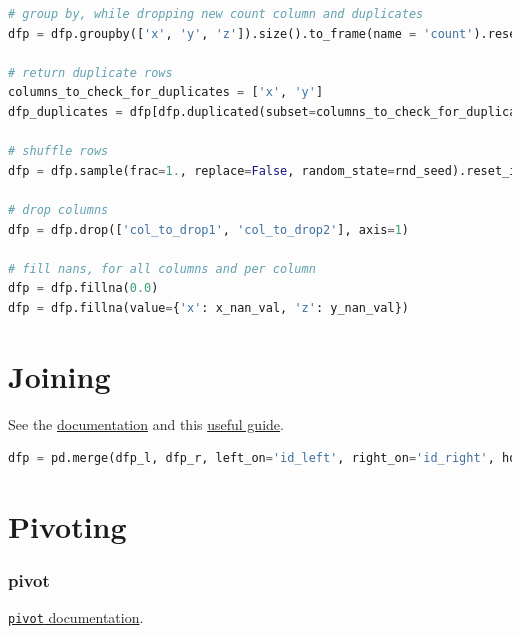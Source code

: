 \begin{lstlisting}[language=Python]
# group by, while dropping new count column and duplicates
dfp = dfp.groupby(['x', 'y', 'z']).size().to_frame(name = 'count').reset_index().drop(['count'], axis=1).drop_duplicates()

# return duplicate rows
columns_to_check_for_duplicates = ['x', 'y']
dfp_duplicates = dfp[dfp.duplicated(subset=columns_to_check_for_duplicates, keep=False)]

# shuffle rows
dfp = dfp.sample(frac=1., replace=False, random_state=rnd_seed).reset_index(drop=True)

# drop columns
dfp = dfp.drop(['col_to_drop1', 'col_to_drop2'], axis=1)

# fill nans, for all columns and per column
dfp = dfp.fillna(0.0)
dfp = dfp.fillna(value={'x': x_nan_val, 'z': y_nan_val})
\end{lstlisting}

\clearpage

\section{Joining}
\label{pandas:join}

\noindent See the \href{https://pandas.pydata.org/pandas-docs/stable/user_guide/merging.html#database-style-dataframe-or-named-series-joining-merging}{documentation} and this \href{http://chrisalbon.com/python/data_wrangling/pandas_join_merge_dataframe/}{useful guide}.

\begin{lstlisting}[language=Python]
dfp = pd.merge(dfp_l, dfp_r, left_on='id_left', right_on='id_right', how='left')
\end{lstlisting}

\section{Pivoting}
\label{pandas:pivoting}

\subsubsection{pivot}
\label{pandas:pivoting:pivot}

\noindent \href{http://pandas.pydata.org/pandas-docs/stable/reference/api/pandas.DataFrame.pivot.html}{\texttt{pivot} documentation}.

